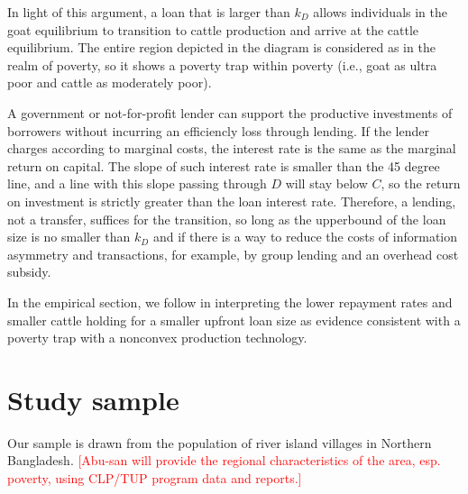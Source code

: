 	In light of this argument, a loan that is larger than $k_{D}$ allows individuals in the goat equilibrium to transition to cattle production and arrive at the cattle equilibrium. The entire region depicted in the diagram is considered as in the realm of poverty, so it shows a poverty trap within poverty (i.e., goat as ultra poor and cattle as moderately poor). 

	A government or not-for-profit lender can support the productive investments of borrowers without incurring an efficiencly loss through lending. If the lender charges according to marginal costs, the interest rate is the same as the marginal return on capital. The slope of such interest rate is smaller than the 45 degree line, and a line with this slope passing through $D$ will stay below $C$, so the return on investment is strictly greater than the loan interest rate. Therefore, a lending, not a transfer, suffices for the transition, so long as the upperbound of the loan size is no smaller than $k_{D}$ and if there is a way to reduce the costs of information asymmetry and transactions, for example, by group lending and an overhead cost subsidy.

	In the empirical section, we follow \citet{BandieraBRAC2017} in interpreting the lower repayment rates and smaller cattle holding for a smaller upfront loan size as evidence consistent with a poverty trap with a nonconvex production technology. 

\section{Study sample}
\label{SecStudySample}

	Our sample is drawn from the population of river island villages in Northern Bangladesh. 
	\textcolor{red}{[Abu-san will provide the regional characteristics of the area, esp. poverty, using CLP/TUP program data and reports.]}
	
